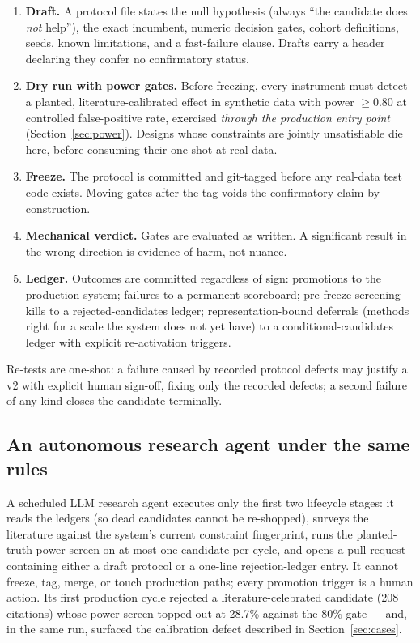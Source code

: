 \documentclass[11pt]{article}
\begin{document}
\begin{enumerate}
\item \textbf{Draft.} A protocol file states the null hypothesis
  (always ``the candidate does \emph{not} help''), the exact incumbent,
  numeric decision gates, cohort definitions, seeds, known limitations,
  and a fast-failure clause. Drafts carry a header declaring they confer
  no confirmatory status.
\item \textbf{Dry run with power gates.} Before freezing, every
  instrument must detect a planted, literature-calibrated effect in
  synthetic data with power $\geq 0.80$ at controlled false-positive
  rate, exercised \emph{through the production entry point}
  (Section~\ref{sec:power}). Designs whose constraints are jointly
  unsatisfiable die here, before consuming their one shot at real data.
\item \textbf{Freeze.} The protocol is committed and git-tagged before
  any real-data test code exists. Moving gates after the tag voids the
  confirmatory claim by construction.
\item \textbf{Mechanical verdict.} Gates are evaluated as written. A
  significant result in the wrong direction is evidence of harm, not
  nuance.
\item \textbf{Ledger.} Outcomes are committed regardless of sign:
  promotions to the production system; failures to a permanent
  scoreboard; pre-freeze screening kills to a rejected-candidates
  ledger; representation-bound deferrals (methods right for a scale the
  system does not yet have) to a conditional-candidates ledger with
  explicit re-activation triggers.
\end{enumerate}

Re-tests are one-shot: a failure caused by recorded protocol defects may
justify a v2 with explicit human sign-off, fixing only the recorded
defects; a second failure of any kind closes the candidate terminally.

\subsection{An autonomous research agent under the same rules}
\label{sec:scout}

A scheduled LLM research agent executes only the first two lifecycle
stages: it reads the ledgers (so dead candidates cannot be re-shopped),
surveys the literature against the system's current constraint
fingerprint, runs the planted-truth power screen on at most one
candidate per cycle, and opens a pull request containing either a draft
protocol or a one-line rejection-ledger entry. It cannot freeze, tag,
merge, or touch production paths; every promotion trigger is a human
action. Its first production cycle rejected a literature-celebrated
candidate (208 citations) whose power screen topped out at 28.7\%
against the 80\% gate --- and, in the same run, surfaced the calibration
defect described in Section~\ref{sec:cases}.
\end{document}
